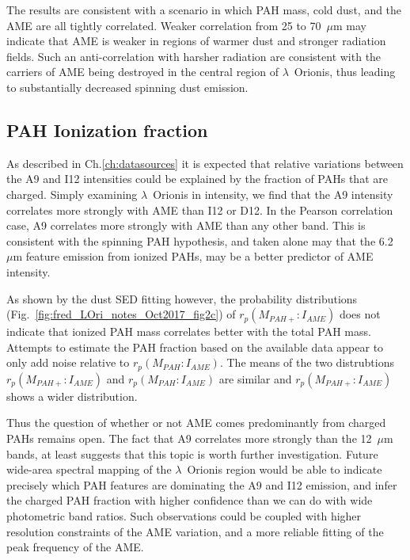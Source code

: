         The results are consistent with a scenario in which PAH mass, cold dust, and the AME are all tightly correlated. Weaker correlation from 25 to 70~$\mu$m may indicate that AME is weaker in regions of warmer dust and stronger radiation fields. Such an anti-correlation with harsher radiation are consistent with the carriers of AME being destroyed in the central region of $\lambda$~Orionis, thus leading to substantially decreased spinning dust emission.

      \subsection{PAH Ionization fraction}
          As described in Ch.\ref{ch:datasources} it is expected that relative variations between the A9 and I12 intensities could be explained by the fraction of PAHs that are charged. Simply examining $\lambda$~Orionis in intensity, we find that the A9 intensity correlates more strongly with AME than I12 or D12. In the Pearson correlation case, A9 correlates more strongly with AME than any other band. This is consistent with the spinning PAH hypothesis, and taken alone may that the 6.2~$\mu$m feature emission from ionized PAHs, may be a better predictor of AME intensity.

          As shown by the dust SED fitting however, the probability distributions (Fig.~\ref{fig:fred_LOri_notes_Oct2017_fig2c}) of $r_{p}(M_{PAH+}:I_{AME})$ does not indicate that ionized PAH mass correlates better with the total PAH mass. Attempts to estimate the PAH fraction based on the available data appear to only add noise relative to $r_{p}(M_{PAH}:I_{AME})$. The means of the two distrubtions $r_{p}(M_{PAH+}:I_{AME})$  and $r_{p}(M_{PAH}:I_{AME})$ are similar and $r_{p}(M_{PAH+}:I_{AME})$ shows a wider distribution.

         Thus the question of whether or not AME comes predominantly from charged PAHs remains open. The fact that A9 correlates more strongly than the 12~$\mu$m bands, at least suggests that this topic is worth further investigation. Future wide-area spectral mapping of the $\lambda$~Orionis region would be able to indicate precisely which PAH features are dominating the A9 and I12 emission, and infer the charged PAH fraction with higher confidence than we can do with wide photometric band ratios. Such observations could be coupled with higher resolution constraints of the AME variation, and a more reliable fitting of the peak frequency of the AME.
